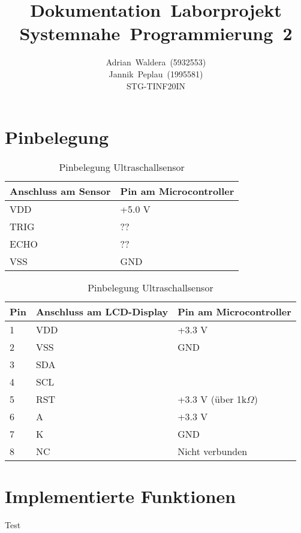 \documentclass[german]{article}
\title{\textbf{Dokumentation~Laborprojekt\\Systemnahe~Programmierung~2}}
\author{
    Adrian~Waldera~(5932553) \\
    Jannik~Peplau~(1995581) \\
    STG-TINF20IN\\
}
\begin{document}
\maketitle

\section{Pinbelegung}

\begin{table}[H]\centering\begin{tabular}{|l|l|}
\hline
Anschluss am Sensor & Pin am Microcontroller\\\hline
VDD & +5.0 V\\\hline
TRIG & ??\\\hline
ECHO & ??\\\hline
VSS & GND\\\hline
\end{tabular}\caption{Pinbelegung Ultraschallsensor}\end{table}\label{tab-pinsus}

\begin{table}[H]\centering\begin{tabular}{|l|l|l|}
\hline
Pin & Anschluss am LCD-Display & Pin am Microcontroller\\\hline
1 & VDD & +3.3 V\\\hline
2 & VSS & GND\\\hline
3 & SDA & \\\hline
4 & SCL & \\\hline
5 & RST & +3.3 V (über 1k$\Omega$)\\\hline
6 & A & +3.3 V\\\hline
7 & K & GND \\\hline
8 & NC & Nicht verbunden\\\hline
\end{tabular}\caption{Pinbelegung Ultraschallsensor}\end{table}\label{tab-pinsus}

\section{Implementierte Funktionen}
Test
\end{document}
